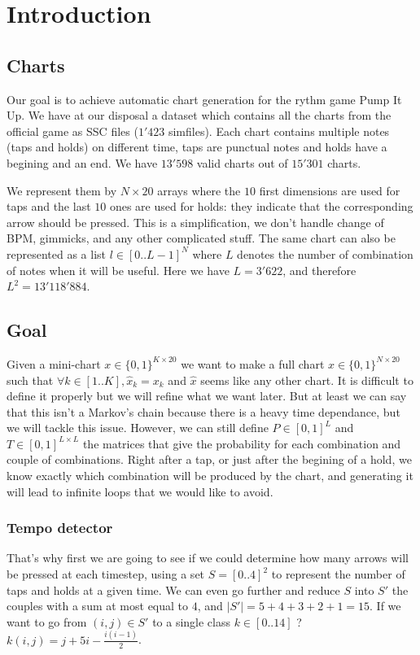 \documentclass[11pt]{article}
\newcommand{\abs}[1]{\left\lvert #1 \right\rvert}
\begin{document}
\section{Introduction}
\subsection{Charts}
Our goal is to achieve automatic chart generation for the rythm game Pump It Up. We have at our disposal a dataset which contains all the charts from the official game as SSC files ($1'423$ simfiles). Each chart contains multiple notes (taps and holds) on different time, taps are punctual notes and holds have a begining and an end. We have $13'598$ valid charts out of $15'301$ charts.  

We represent them by $N \times 20$ arrays where the $10$ first dimensions are used for taps and the last $10$ ones are used for holds: they indicate that the corresponding arrow should be pressed. This is a simplification, we don't handle change of BPM, gimmicks, and any other complicated stuff. The same chart can also be represented as a list $l \in [0..L-1]^N$ where $L$ denotes the number of combination of notes when it will be useful. Here we have $L = 3'622$, and therefore $L^2 = 13'118'884$. 

\subsection{Goal}
Given a mini-chart $x \in \{0, 1\}^{K \times 20}$ we want to make a full chart $\hat{x} \in \{0, 1 \}^{N \times 20}$ such that $\forall{k \in [1..K]}, \hat{x}_k = x_k$ and $\hat{x}$ seems like any other chart. It is difficult to define it properly but we will refine what we want later. But at least we can say that this isn't a Markov's chain because there is a heavy time dependance, but we will tackle this issue. However, we can still define $P \in [0,1]^L$ and $T \in [0,1]^{L \times L}$ the matrices that give the probability for each combination and couple of combinations. Right after a tap, or just after the begining of a hold, we know exactly which combination will be produced by the chart, and generating it will lead to infinite loops that we would like to avoid. 

\subsubsection{Tempo detector}
That's why first we are going to see if we could determine how many arrows will be pressed at each timestep, using a set $S = [0..4]^2$ to represent the number of taps and holds at a given time. We can even go further and reduce $S$ into $S'$ the couples with a sum at most equal to $4$, and $\abs{S'} = 5+4+3+2+1 = 15$. If we want to go from $(i,j) \in S'$ to a single class $k \in [0..14]$ ? $k(i,j) = j + 5i - \frac{i(i-1)}{2}$. 
\end{document}
